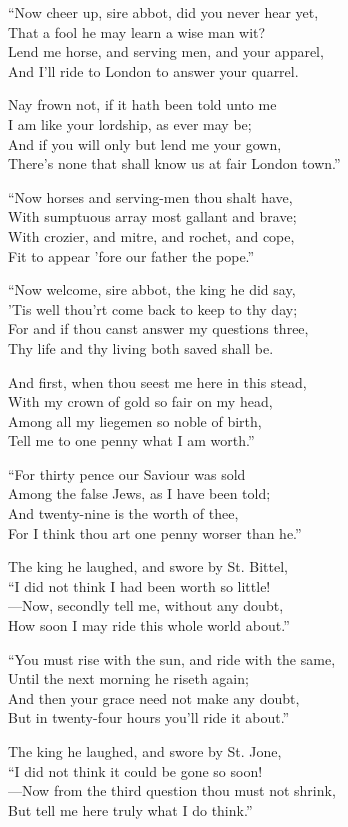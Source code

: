 \begin{dcverse}
“Now cheer up, sire abbot, did you never hear yet,\\
That a fool he may learn a wise man wit?\\
Lend me horse, and serving men, and your apparel,\\
And I’ll ride to London to answer your quarrel.

Nay frown not, if it hath been told unto me\\
I am like your lordship, as ever may be;\\
And if you will only but lend me your gown,\\
There’s none that shall know us at fair London town.”

“Now horses and serving-men thou shalt have,\\
With sumptuous array most gallant and brave;\\
With crozier, and mitre, and rochet, and cope,\\
Fit to appear ’fore our father the pope.”

“Now welcome, sire abbot, the king he did say,\\
’Tis well thou’rt come back to keep to thy day;\\
For and if thou canst answer my questions three,\\
Thy life and thy living both saved shall be.

And first, when thou seest me here in this stead,\\
With my crown of gold so fair on my head,\\
Among all my liegemen so noble of birth,\\
Tell me to one penny what I am worth.”

“For thirty pence our Saviour was sold\\
Among the false Jews, as I have been told;\\
And twenty-nine is the worth of thee,\\
For I think thou art one penny worser than he.”

The king he laughed, and swore by St. Bittel,\\
“I did not think I had been worth so little!\\
—Now, secondly tell me, without any doubt,\\
How soon I may ride this whole world about.”

“You must rise with the sun, and ride with the same,\\
Until the next morning he riseth again;\\
And then your grace need not make any doubt,\\
But in twenty-four hours you’ll ride it about.”

The king he laughed, and swore by St. Jone,\\
“I did not think it could be gone so soon!\\
—Now from the third question thou must not shrink,\\
But tell me here truly what I do think.”

\end{dcverse}
\pagebreak

